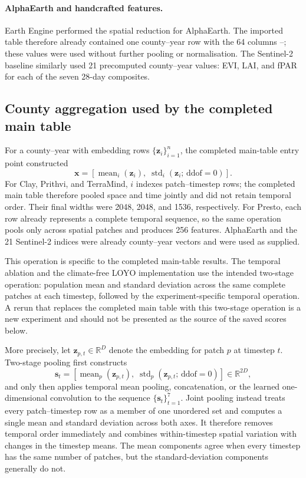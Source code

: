 \paragraph{AlphaEarth and handcrafted features.}
Earth Engine performed the spatial reduction for AlphaEarth.  The imported
table therefore already contained one county--year row with the 64 columns
--; these values were used without further
pooling or normalisation.  The Sentinel-2 baseline similarly used 21
precomputed county--year values: EVI, LAI, and fPAR for each of the seven
28-day composites.

\subsection{County aggregation used by the completed main table}

For a county--year with embedding rows $\{\mathbf{z}_i\}_{i=1}^{n}$, the
completed main-table entry point constructed
\begin{equation}
  \mathbf{x}=
  \left[
    \operatorname{mean}_{i}(\mathbf{z}_i),\;
    \operatorname{std}_{i}(\mathbf{z}_i;\,\mathrm{ddof}=0)
  \right].
\end{equation}
For Clay, Prithvi, and TerraMind, $i$ indexes patch--timestep rows; the completed
main table therefore pooled space and time jointly and did not retain temporal
order.  Their final widths were 2048, 2048, and 1536, respectively.  For
Presto, each row already represents a complete temporal sequence, so the same
operation pools only across spatial patches and produces 256 features.
AlphaEarth and the 21 Sentinel-2 indices were already county--year vectors and
were used as supplied.

This operation is specific to the completed main-table results.  The temporal
ablation and the climate-free LOYO implementation use the intended two-stage
operation: population mean and standard deviation across the same complete
patches at each timestep, followed by the experiment-specific temporal
operation.  A rerun that replaces the completed main table with this two-stage
operation is a new experiment and should not be presented as the source of the
saved scores below.

More precisely, let $\mathbf{z}_{p,t}\in\mathbb{R}^{D}$ denote the embedding
for patch $p$ at timestep $t$.  Two-stage pooling first constructs
\begin{equation}
  \mathbf{s}_{t}=
  \left[
    \operatorname{mean}_{p}(\mathbf{z}_{p,t}),\;
    \operatorname{std}_{p}(\mathbf{z}_{p,t};\,\mathrm{ddof}=0)
  \right]\in\mathbb{R}^{2D},
\end{equation}
and only then applies temporal mean pooling, concatenation, or the learned
one-dimensional convolution to the sequence
$\{\mathbf{s}_{t}\}_{t=1}^{7}$.  Joint pooling instead treats every
patch--timestep row as a member of one unordered set and computes a single
mean and standard deviation across both axes.  It therefore removes temporal
order immediately and combines within-timestep spatial variation with changes
in the timestep means.  The mean components agree when every timestep has the
same number of patches, but the standard-deviation components generally do
not.

